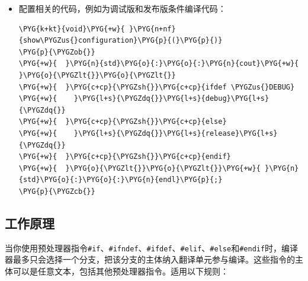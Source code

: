 \begin{itemize}

\item 配置相关的代码，例如为调试版和发布版条件编译代码：



\begin{codeblockbg}
\begin{Verbatim}[commandchars=\\\{\},breaklines=true,breakanywhere=true,fontsize=\codefont,xleftmargin=17bp]
\PYG{k+kt}{void}\PYG{+w}{ }\PYG{n+nf}{show\PYGZus{}configuration}\PYG{p}{(}\PYG{p}{)}
\PYG{p}{\PYGZob{}}
\PYG{+w}{  }\PYG{n}{std}\PYG{o}{:}\PYG{o}{:}\PYG{n}{cout}\PYG{+w}{ }\PYG{o}{\PYGZlt{}}\PYG{o}{\PYGZlt{}}
\PYG{+w}{  }\PYG{c+cp}{\PYGZsh{}}\PYG{c+cp}{ifdef \PYGZus{}DEBUG}
\PYG{+w}{    }\PYG{l+s}{\PYGZdq{}}\PYG{l+s}{debug}\PYG{l+s}{\PYGZdq{}}
\PYG{+w}{  }\PYG{c+cp}{\PYGZsh{}}\PYG{c+cp}{else}
\PYG{+w}{    }\PYG{l+s}{\PYGZdq{}}\PYG{l+s}{release}\PYG{l+s}{\PYGZdq{}}
\PYG{+w}{  }\PYG{c+cp}{\PYGZsh{}}\PYG{c+cp}{endif}
\PYG{+w}{  }\PYG{o}{\PYGZlt{}}\PYG{o}{\PYGZlt{}}\PYG{+w}{ }\PYG{n}{std}\PYG{o}{:}\PYG{o}{:}\PYG{n}{endl}\PYG{p}{;}
\PYG{p}{\PYGZcb{}}
\end{Verbatim}
\end{codeblockbg}

\end{itemize}



\subsection{工作原理}



当你使用预处理器指令\texttt{\#if}、\texttt{\#ifndef}、\texttt{\#ifdef}、\texttt{\#elif}、\texttt{\#else}和\texttt{\#endif}时，编译器最多只会选择一个分支，把该分支的主体纳入翻译单元参与编译。这些指令的主体可以是任意文本，包括其他预处理器指令。适用以下规则：



